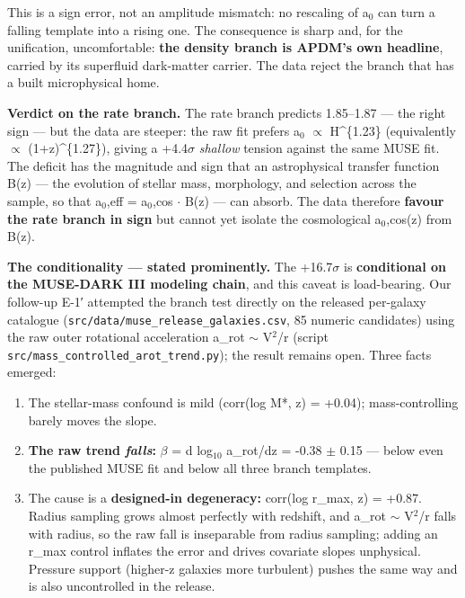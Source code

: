 \documentclass[aps,prd,preprint,nofootinbib,superscriptaddress]{revtex4-2}
\providecommand{\tightlist}{\setlength{\itemsep}{0pt}\setlength{\parskip}{0pt}}
\begin{document}
This is a sign error, not an amplitude mismatch: no rescaling of
a\(_{0}\) can turn a falling template into a rising one. The consequence
is sharp and, for the unification, uncomfortable: \textbf{the density
branch is APDM's own headline}, carried by its superfluid dark-matter
carrier. The data reject the branch that has a built microphysical home.

\textbf{Verdict on the rate branch.} The rate branch predicts 1.85--1.87
--- the right sign --- but the data are steeper: the raw fit prefers
a\(_{0}\) \(\propto\) H\^{}\{1.23\} (equivalently \(\propto\)
(1+z)\^{}\{1.27\}), giving a +4.4\(\sigma\) \emph{shallow} tension
against the same MUSE fit. The deficit has the magnitude and sign that
an astrophysical transfer function B(z) --- the evolution of stellar
mass, morphology, and selection across the sample, so that a\(_{0}\),eff
= a\(_{0}\),cos \(\cdot\) B(z) --- can absorb. The data therefore
\textbf{favour the rate branch in sign} but cannot yet isolate the
cosmological a\(_{0}\),cos(z) from B(z).

\textbf{The conditionality --- stated prominently.} The +16.7\(\sigma\)
is \textbf{conditional on the MUSE-DARK III modeling chain}, and this
caveat is load-bearing. Our follow-up E-1′ attempted the branch test
directly on the released per-galaxy catalogue
(\texttt{src/\allowbreak data/\allowbreak muse\_\allowbreak release\_\allowbreak galaxies.\allowbreak csv}, 85 numeric candidates)
using the raw outer rotational acceleration a\_rot \(\sim\) V\(^{2}\)/r
(script \texttt{src/\allowbreak mass\_\allowbreak controlled\_\allowbreak arot\_\allowbreak trend.\allowbreak py}); the result
remains open. Three facts emerged:

\begin{enumerate}
\def\labelenumi{\arabic{enumi}.}
\tightlist
\item
  The stellar-mass confound is mild (corr(log M*, z) = +0.04);
  mass-controlling barely moves the slope.
\item
  \textbf{The raw trend \emph{falls}:} \(\beta\) = d log\(_{10}\)
  a\_rot/dz = -0.38 \(\pm\) 0.15 --- below even the published MUSE fit
  and below all three branch templates.
\item
  The cause is a \textbf{designed-in degeneracy:} corr(log r\_max, z) =
  +0.87. Radius sampling grows almost perfectly with redshift, and
  a\_rot \(\sim\) V\(^{2}\)/r falls with radius, so the raw fall is
  inseparable from radius sampling; adding an r\_max control inflates
  the error and drives covariate slopes unphysical. Pressure support
  (higher-z galaxies more turbulent) pushes the same way and is also
  uncontrolled in the release.
\end{enumerate}
\end{document}

